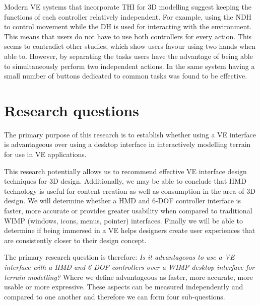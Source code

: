 \documentclass{sig-alternate-05-2015}
\begin{document}
Modern VE systems that incorporate THI for 3D modelling suggest keeping the functions of each controller relatively independent\cite{Mine2014}. For example, using the NDH to control movement while the DH is used for interacting with the environment. This means that users do not have to use both controllers for every action. This seems to contradict other studies, which show users favour using two hands when able to\cite{Buxton1986,Hinckley1994}. However, by separating the tasks  users have the advantage of being able to simultaneously perform two independent actions.  In the same system having a small number of buttons dedicated to common tasks was found to be effective\cite{Mine2014}.


\section{Research questions}
The primary purpose of this research is to establish whether using a VE interface is advantageous over using a desktop interface in interactively modelling terrain for use in VE applications.

This research potentially allows us to recommend effective VE interface design techniques for 3D design. Additionally, we may be able to conclude that HMD technology is useful for content creation as well as consumption in the area of 3D design. We will determine whether a HMD and 6-DOF controller interface is faster, more accurate or provides greater usability when compared to traditional WIMP (windows, icons, menus, pointer) interfaces. Finally we will be able to determine if being immersed in a VE helps designers create user experiences that are consistently closer to their design concept.

The primary research question is therefore: \textit{Is it advantageous to use a VE interface with a HMD and 6-DOF controllers over a WIMP desktop interface for terrain modelling?}
Where we define advantageous as faster, more accurate, more usable or more expressive. These aspects can be measured independently and compared to one another and therefore we can form four sub-questions.
\end{document}

